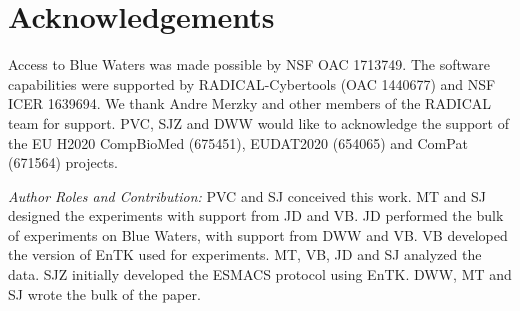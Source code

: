 \documentclass[conference]{IEEEtran}
\begin{document}
%
%
%
\section*{Acknowledgements}
%
\footnotesize

Access to Blue Waters was made possible by NSF OAC 1713749. The software
capabilities were supported by RADICAL-Cybertools (OAC 1440677) and NSF ICER
1639694. We thank Andre Merzky and other members of the RADICAL team for
support. PVC, SJZ and DWW would like to acknowledge the support of the EU
H2020 CompBioMed (675451), EUDAT2020 (654065) and ComPat (671564) projects.

{\it Author Roles and Contribution:} PVC and SJ conceived this work. MT and SJ
designed the experiments with support from JD and VB. JD performed the bulk of
experiments on Blue Waters, with support from DWW and VB. VB developed the
version of EnTK used for experiments. MT, VB, JD and SJ analyzed the data. SJZ
initially developed the ESMACS protocol using EnTK. DWW, MT and SJ wrote the
bulk of the paper.

%

%

%

%



%
%
 

%
%
%


\end{document}
